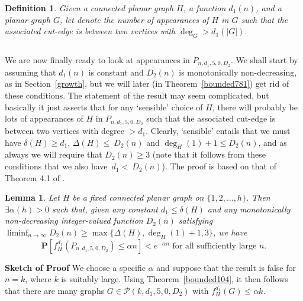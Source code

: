 \documentclass{article}
\newtheorem{Lemma}[Theorem]{Lemma}
\newtheorem{Proof of Theorem}{Proof of Theorem}
\newtheorem{Definition}[Theorem]{Definition}
\begin{document}
 

\begin{Definition}
Given a connected planar graph $H$,
a function $d_{1}(n)$,
and a planar graph $G$,
let \emph{} denote the number of appearances of $H$ in $G$ 
such that the associated cut-edge is between
two vertices with $\deg_{G} > d_{1}(|G|)$. 
\end{Definition}















\begin{displaymath}
\end{displaymath}

We are now finally ready to look at appearances in $P_{n,d_{1},5,0,D_{2}}$.
We shall start by assuming that $d_{1}(n)$ is constant and $D_{2}(n)$ is monotonically non-decreasing,
as in Section~\ref{growth},
but we will later (in Theorem~\ref{bounded781}) get rid of these conditions.
The statement of the result may seem complicated,
but basically it just asserts that for any `sensible' choice of $H$,
there will probably be lots of appearances of $H$ in $P_{n,d_{1},5,0,D_{2}}$
such that the associated cut-edge is between two vertices with degree $>d_{1}$.
Clearly, `sensible' entails that we must have $\delta(H) \geq d_{1}$,
$\Delta(H) \leq~\!D_{2}(n)$ and $\deg_{H}(1)+1 \leq D_{2}(n)$,
and as always we will require that $D_{2}(n) \geq 3$
(note that it follows from these conditions that we also have~$d_{1}<~\!D_{2}(n)$).
The proof is based on that of Theorem 4.1 of \cite{mcd}.















\begin{Lemma} \label{bounded106}
Let $H$ be a fixed connected planar graph on $\{ 1,2, \ldots, h \}$.
Then $\exists \alpha(h)>0$ such that,
given any constant $d_{1} \leq \delta(H)$
and any monotonically non-decreasing integer-valued function $D_{2}(n)$ satisfying
$\liminf_{n \to \infty}D_{2}(n) \geq \max \{ \Delta(H), \deg_{H}(1)+1, 3 \}$,
we have
\begin{displaymath}
\mathbf{P} [ f_{H}^{d_{1}} (P_{n,d_{1},5,0,D_{2}}) \leq \alpha n ] < e^{-\alpha n} \textrm{ for all sufficiently large }n.
\end{displaymath}
\end{Lemma}
\textbf{Sketch of Proof}
We choose a specific $\alpha$
and suppose that the result is false for~$n=k$,
where $k$ is suitably large.
Using Theorem~\ref{bounded104},
it then follows that there are many graphs $G \in \mathcal{P}(k,d_{1},5,0,D_{2})$ with $f_{H}^{d_{1}}(G) \leq \alpha k$.
\end{document}
